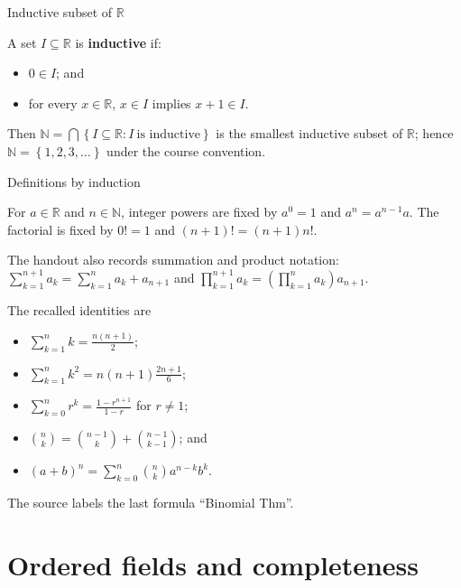 \begin{definition}{Inductive subset of \(\mathbb{R}\)}

A set \(I \subseteq \mathbb{R}\) is \textbf{inductive} if:

\begin{itemize}
\tightlist
\item
  \(0 \in I\); and
\item
  for every \(x \in \mathbb{R}\), \(x \in I\) implies \(x + 1 \in I\).
\end{itemize}

Then \(\mathbb{N} = \bigcap\left\{ {I \subseteq \mathbb{R}:I\ \text{is inductive}} \right\}\) is the smallest inductive subset of \(\mathbb{R}\); hence \(\mathbb{N} = \left\{ {1,2,3,\ldots} \right\}\) under the course convention.

\end{definition}

\begin{definition}{Definitions by induction}

For \(a \in \mathbb{R}\) and \(n \in \mathbb{N}\), integer powers are fixed by \(a^{0} = 1\) and \(a^{n} = a^{n - 1}a\). The factorial is fixed by \(0! = 1\) and \(\left( {n + 1} \right)! = \left( {n + 1} \right)n!\).

The handout also records summation and product notation: \(\sum_{k = 1}^{n + 1}a_{k} = \sum_{k = 1}^{n}a_{k} + a_{n + 1}\) and \(\prod_{k = 1}^{n + 1}a_{k} = \left( {\prod_{k = 1}^{n}a_{k}} \right)a_{n + 1}\).

\end{definition}

The recalled identities are

\begin{itemize}
\tightlist
\item
  \(\sum_{k = 1}^{n}k = \frac{n\left( {n + 1} \right)}{2}\);
\item
  \(\sum_{k = 1}^{n}k^{2} = n\left( {n + 1} \right)\frac{2n + 1}{6}\);
\item
  \(\sum_{k = 0}^{n}r^{k} = \frac{1 - r^{n + 1}}{1 - r}\) for \(r \neq 1\);
\item
  \(\binom{n}{k} = \binom{n - 1}{k} + \binom{n - 1}{k - 1}\); and
\item
  \(\left( {a + b} \right)^{n} = \sum_{k = 0}^{n}\binom{n}{k}a^{n - k}b^{k}\).
\end{itemize}

The source labels the last formula ``Binomial Thm''.

\section{Ordered fields and completeness}

